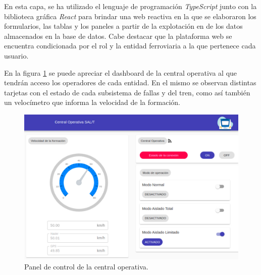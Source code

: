 En esta capa, se ha utilizado el lenguaje de programación \textit{TypeScript} \cite{b19} junto con la biblioteca gráfica \textit{React} \cite{b20} para brindar una web reactiva en la que se elaboraron los formularios, las tablas y los paneles a partir de la explotación en de los datos almacenados en la base de datos. Cabe destacar que la plataforma web se encuentra condicionada por el rol y la entidad ferroviaria a la que pertenece cada usuario.

En la figura \ref{fig:dashboard} se puede apreciar el dashboard de la central operativa al que tendrán acceso los operadores de cada entidad.
En el mismo se observan distintas tarjetas con el estado de cada subsistema de fallas y del tren, como así también un velocímetro que
informa la velocidad de la formación.

\begin{figure}[ht]
\centering 
\includegraphics[width=.48\textwidth]{images/v2.1.0/dashboard.jpg}
\caption{Panel de control de la central operativa.}
\label{fig:dashboard}
\end{figure}
